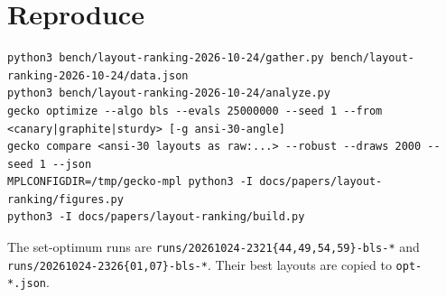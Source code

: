 \documentclass{gecko-paper}
\begin{document}
{\section{Reproduce}

\begin{verbatim}
python3 bench/layout-ranking-2026-10-24/gather.py bench/layout-ranking-2026-10-24/data.json
python3 bench/layout-ranking-2026-10-24/analyze.py
gecko optimize --algo bls --evals 25000000 --seed 1 --from <canary|graphite|sturdy> [-g ansi-30-angle]
gecko compare <ansi-30 layouts as raw:...> --robust --draws 2000 --seed 1 --json
MPLCONFIGDIR=/tmp/gecko-mpl python3 -I docs/papers/layout-ranking/figures.py
python3 -I docs/papers/layout-ranking/build.py
\end{verbatim}

The set-optimum runs are \texttt{runs/20261024-2321\{44,49,54,59\}-bls-*} and \texttt{runs/20261024-2326\{01,07\}-bls-*}. Their best layouts are copied to \texttt{opt-*.json}.

}
\end{document}
